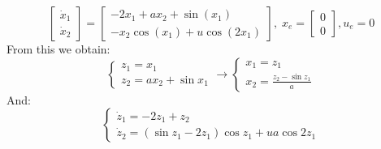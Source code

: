 \ex{}
{
    \begin{equation}
        \label{ISL:ex_1}
        \begin{bmatrix}
            \dot{x}_1  \\
            \dot{x}_2
        \end{bmatrix}
        = \begin{bmatrix}
            -2x_1+ax_2+\sin(x_1)  \\
            -x_2\cos(x_1)+u\cos(2x_1)  
        \end{bmatrix},\; x_e=\begin{bmatrix}
            0\\0
        \end{bmatrix}
        , u_e=0
    \end{equation}
    From this we obtain:
    \begin{equation}
        \label{ISL:ex_2}
       \begin{cases}
           z_1=x_1\\
           z_2=ax_2+\sin {x_1}
       \end{cases}
       \rightarrow 
       \begin{cases}
           x_1=z_1\\
           x_2=\frac{z_2-\sin{z_1}}{a}
       \end{cases}
    \end{equation}
    And:
    \begin{equation}
        \label{ISL:ex_3}
        \begin{cases}
            \dot{z}_1 = -2z_1+z_2\\
            \dot{z}_2 = (\sin{z_1}-2z_1)\cos{z_1}+ua\cos{2z_1}
        \end{cases}
    \end{equation}

}
